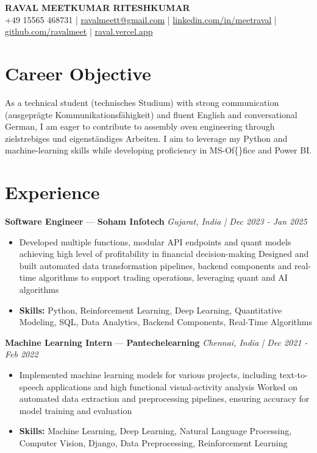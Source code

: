\documentclass[a4paper,10pt]{article}
\begin{document}
\begin{center}
  {\Large\bfseries RAVAL MEETKUMAR RITESHKUMAR}\\[2pt]
  {\small +49 15565 468731 \;|\; \href{mailto:ravalmeett@gmail.com}{ravalmeett@gmail.com} \;|\; \href{https://www.linkedin.com/in/meetraval/}{linkedin.com/in/meetraval} \;|\; \href{https://github.com/ravalmeet}{github.com/ravalmeet} \;|\; \href{https://raval.vercel.app/}{raval.vercel.app}}
\end{center}
\vspace{-3pt}

\section*{Career Objective}
As a technical student (technisches Studium) with strong communication (ausgeprägte Kommunikationsfähigkeit) and fluent English and conversational German, I am eager to contribute to assembly oven engineering through zielstrebiges und eigenständiges Arbeiten. I aim to leverage my Python and machine-learning skills while developing proficiency in MS-Of\{\}fice and Power BI.\par

\section*{Experience}
\textbf{Software Engineer} — \textbf{Soham Infotech} \hfill \textit{Gujarat, India \;|\; Dec 2023 - Jan 2025}\par
\vspace{1pt}
\begin{itemize}
  \item Developed multiple functions, modular API endpoints and quant models achieving high level of profitability in financial decision-making Designed and built automated data transformation pipelines, backend components and real-time algorithms to support trading operations, leveraging quant and AI algorithms
  \item \textbf{Skills:} Python, Reinforcement Learning, Deep Learning, Quantitative Modeling, SQL, Data Analytics, Backend Components, Real-Time Algorithms
\end{itemize}
\vspace{3pt}
\textbf{Machine Learning Intern} — \textbf{Pantechelearning} \hfill \textit{Chennai, India \;|\; Dec 2021 - Feb 2022}\par
\vspace{1pt}
\begin{itemize}
  \item Implemented machine learning models for various projects, including text-to-speech applications and high functional visual-activity analysis Worked on automated data extraction and preprocessing pipelines, ensuring accuracy for model training and evaluation
  \item \textbf{Skills:} Machine Learning, Deep Learning, Natural Language Processing, Computer Vision, Django, Data Preprocessing, Reinforcement Learning
\end{itemize}
\end{document}

